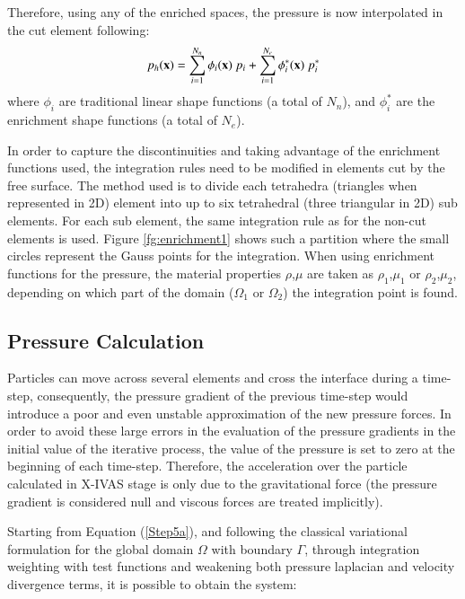 Therefore, using any of the enriched spaces, the pressure is now interpolated in the cut element following:
 \begin{equation}
      p_h(\mathbf{x}) = \sum_{i=1}^{N_n} \phi_i(\mathbf{x}) \ p_i + \sum_{i=1}^{N_e} \phi_i^*(\mathbf{x}) \ p_i^*
   \end{equation}
where $\phi_i$ are traditional linear shape functions (a total of $N_n$), and $\phi_i^*$ are the enrichment shape functions (a total of $N_e$).

In order to capture the discontinuities and taking advantage of the enrichment functions used, the integration rules need to be modified in elements cut by the free surface. The method used is to divide each tetrahedra (triangles when represented in 2D) element into up to six tetrahedral
(three triangular in 2D) sub elements. For each sub element, the same integration rule as for the non-cut elements is used. Figure \ref{fg:enrichment1} shows such a partition where the small circles represent the Gauss points for the integration. When using enrichment functions for the pressure, the material properties $\rho$,$\mu$ are taken as $\rho_1$,$\mu_1$ or $\rho_2$,$\mu_2$, depending on which part of the domain ($\Omega_1$ or $\Omega_2$) the integration point is found.

   \subsection{Pressure Calculation}

Particles can move across several elements and cross the interface during a time-step, consequently, the pressure gradient of the previous time-step would introduce a poor and even unstable approximation of the new pressure forces. In order to avoid these large errors in the evaluation of the pressure gradients in the initial value of the iterative process, the value of the pressure is set to zero at the beginning of each time-step. Therefore, the acceleration over the particle calculated in X-IVAS stage is only due to the gravitational force (the pressure gradient is considered null and viscous forces are treated implicitly)\cite{Idelsohn13c}.

Starting from Equation (\ref{Step5a}), and following the classical variational formulation for the global domain $\Omega$ with boundary $\Gamma$, through integration weighting with test functions and weakening both pressure laplacian and velocity divergence terms, it is possible to obtain the system:

